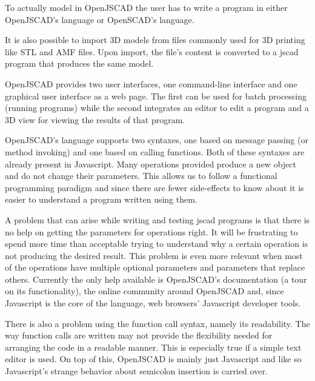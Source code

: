 \documentclass{./llncs2e/llncs}
\begin{document}
	To actually model in OpenJSCAD the user has to write a program in either OpenJSCAD's language or OpenSCAD's language.

	It is also possible to import 3D models from files commonly used for 3D printing like STL and AMF files.
	Upon import, the file's content is converted to a jscad program that produces the same model. 

	OpenJSCAD provides two user interfaces, one command-line interface and one graphical user interface as a web page.
	The first can be used for batch processing (running programs) while the second integrates an editor to edit a program and a 3D view for viewing the results of that program.

	OpenJSCAD's language supports two syntaxes, one based on message passing (or method invoking) and one based on calling functions.
	Both of these syntaxes are already present in Javascript. 
	Many operations provided produce a new object and do not change their parameters. 
	This allows us to follow a functional programming paradigm and since there are fewer side-effects to know about it is easier to understand a program written using them.

	A problem that can arise while writing and testing jscad programs is that there is no help on getting the parameters for operations right.
	It will be frustrating to spend more time than acceptable trying to understand why a certain operation is not producing the desired result. 
	This problem is even more relevant when most of the operations have multiple optional parameters and parameters that replace others. 
	Currently the only help available is OpenJSCAD's documentation (a tour on its functionality), the online community around OpenJSCAD and, since Javascript is the core of the language, web browsers' Javascript developer tools.

	There is also a problem using the function call syntax, namely its readability.
	The way function calls are written may not provide the flexibility needed for arranging the code in a readable manner. 
	This is especially true if a simple text editor is used. 
	On top of this, OpenJSCAD is mainly just Javascript and like so Javascript's strange behavior about semicolon insertion is carried over. 

\end{document}
